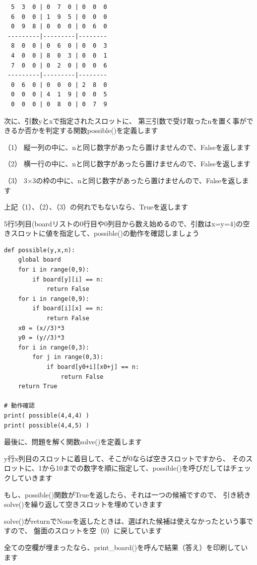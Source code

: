 \documentclass[uplatex,a4paper,11pt,oneside,openany]{jsbook}
\begin{document}
\begin{verbatim}
  5  3  0 | 0  7  0 | 0  0  0
  6  0  0 | 1  9  5 | 0  0  0
  0  9  8 | 0  0  0 | 0  6  0
 ---------|---------|--------
  8  0  0 | 0  6  0 | 0  0  3
  4  0  0 | 8  0  3 | 0  0  1
  7  0  0 | 0  2  0 | 0  0  6
 ---------|---------|--------
  0  6  0 | 0  0  0 | 2  8  0
  0  0  0 | 4  1  9 | 0  0  5
  0  0  0 | 0  8  0 | 0  7  9
\end{verbatim}

次に、引数yとxで指定されたスロットに、
第三引数で受け取ったnを置く事ができるか否かを判定する関数possible()を定義します

（1） 縦一列の中に、nと同じ数字があったら置けませんので、Falseを返します

（2） 横一行の中に、nと同じ数字があったら置けませんので、Falseを返します

（3） 3$\times$3の枠の中に、nと同じ数字があったら置けませんので、Falseを返します

上記（1）、（2）、（3）の何れでもないなら、Trueを返します

5行5列目(boardリストの0行目や0列目から数え始めるので、引数はx=y=4)の空きスロットに値を指定して、possible()の動作を確認しましょう

\begin{lstlisting}[caption=possible,label=sudoku02]
def possible(y,x,n):
    global board
    for i in range(0,9):
        if board[y][i] == n:
            return False
    for i in range(0,9):
        if board[i][x] == n:
            return False
    x0 = (x//3)*3
    y0 = (y//3)*3
    for i in range(0,3):
        for j in range(0,3):
            if board[y0+i][x0+j] == n:
                return False
    return True

# 動作確認
print( possible(4,4,4) )
print( possible(4,4,5) )
\end{lstlisting}

最後に、問題を解く関数solve()を定義します

y行x列目のスロットに着目して、そこが0ならば空きスロットですから、
そのスロットに、1から10までの数字を順に指定して、possible()を呼びだしてはチェックしていきます

もし、possible()関数がTrueを返したら、それは一つの候補ですので、
引き続きsolve()を繰り返して空きスロットを埋めていきます

solve()がreturnでNoneを返したときは、選ばれた候補は使えなかったという事ですので、
盤面のスロットを空（0）に戻しています

全ての空欄が埋まったなら、print\_board()を呼んで結果（答え）を印刷しています
\end{document}
